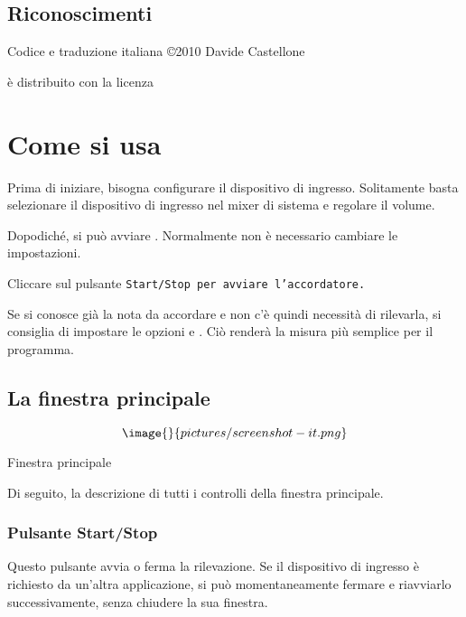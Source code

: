 
\section{Riconoscimenti}\label{credits}

Codice e traduzione italiana \copyright 2010 Davide Castellone

 è distribuito con la licenza


\chapter{Come si usa}\label{using}

Prima di iniziare, bisogna configurare il dispositivo di
ingresso. Solitamente basta selezionare il dispositivo
di ingresso nel mixer di sistema e regolare il volume.

Dopodiché, si può avviare . Normalmente
non è necessario cambiare le impostazioni.

Cliccare sul pulsante \tt{Start/Stop} per avviare l'accordatore.

Se si conosce già la nota da accordare e non c'è quindi
necessità di rilevarla, si consiglia di impostare le
opzioni  e .
Ciò renderà la misura più semplice per il programma.

\section{La finestra principale}\label{mainwindow}

$$\image{}{pictures/screenshot-it.png}$$
\caption{Finestra principale}

Di seguito, la descrizione di tutti i controlli della finestra principale.

\subsection{Pulsante Start/Stop}\label{startstop}

Questo pulsante avvia o ferma la rilevazione. Se il dispositivo
di ingresso è richiesto da un'altra applicazione, si può
momentaneamente fermare  e riavviarlo successivamente,
senza chiudere la sua finestra.

